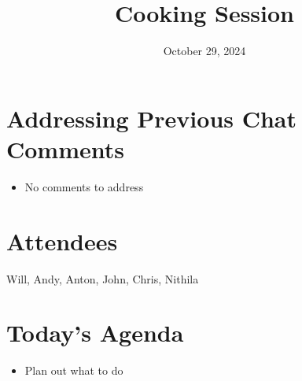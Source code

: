 \documentclass{article}
\title{Cooking Session}
\date{October 29, 2024}
\begin{document}
\maketitle

\section{Addressing Previous Chat Comments}
\begin{itemize}
   \item No comments to address
\end{itemize}

\section{Attendees}

Will, Andy, Anton, John, Chris, Nithila

\section{Today's Agenda}
\begin{itemize}
    \item Plan out what to do
\end{itemize}
\end{document}
